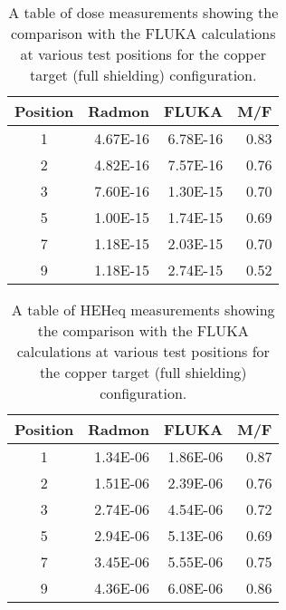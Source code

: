 \begin{table}[htbp]
  \centering
    \begin{tabular}{c|r|r|r}
    \textbf{Position} & \textbf{Radmon} & \textbf{FLUKA} & \textbf{M/F} \\
    \hline
    \hline
    1     & 4.67E-16 & 6.78E-16 & 0.83 \\
    2     & 4.82E-16 & 7.57E-16 & 0.76 \\
    3     & 7.60E-16 & 1.30E-15 & 0.70 \\
    5     & 1.00E-15 & 1.74E-15 & 0.69 \\
    7     & 1.18E-15 & 2.03E-15 & 0.70 \\
    9     & 1.18E-15 & 2.74E-15 & 0.52 \\
    \end{tabular}%
    \caption{A table of dose measurements showing the comparison with the FLUKA calculations at various test positions for the copper target (full shielding) configuration.}
  \label{tab:datatable-cpCIIC-dose}%
\end{table}%

\begin{table}[htbp]
  \centering
    \begin{tabular}{c|r|r|r}
    \textbf{Position} & \textbf{Radmon} & \textbf{FLUKA} & \textbf{M/F} \\
    \hline
    \hline
    1     & 1.34E-06 & 1.86E-06 & 0.87 \\
    2     & 1.51E-06 & 2.39E-06 & 0.76 \\
    3     & 2.74E-06 & 4.54E-06 & 0.72 \\
    5     & 2.94E-06 & 5.13E-06 & 0.69 \\
    7     & 3.45E-06 & 5.55E-06 & 0.75 \\
    9     & 4.36E-06 & 6.08E-06 & 0.86 \\
    \end{tabular}%
    \caption{A table of HEHeq measurements showing the comparison with the FLUKA calculations at various test positions for the copper target (full shielding) configuration.}
  \label{tab:datatable-cpCIIC-heheq}%
\end{table}%





